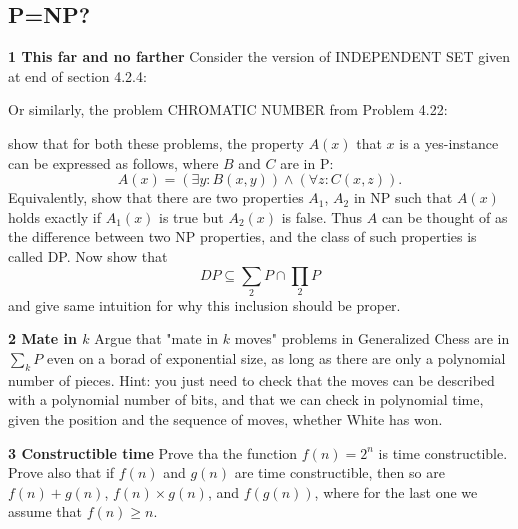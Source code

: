 \documentclass[a4paper,UTF8]{article}
\begin{document}
\subsection{P=NP?}
\textbf{1 This far and no farther} Consider the version of INDEPENDENT SET given at
end of section 4.2.4:
\begin{center}
\end{center}
Or similarly, the problem CHROMATIC NUMBER from Problem 4.22:
\begin{center}
\end{center}
show that for both these problems, the property $A(x)$ that $x$ is a yes-instance can be expressed
as follows, where $B$ and $C$ are in P:
$$ A(x) = (\exists y : B(x, y)) \wedge (\forall z : C(x, z)).$$
Equivalently, show that there are two properties $A_{1}$, $A_{2}$ in NP such that $A(x)$
holds exactly if $A_{1}(x)$ is true but $A_{2}(x)$ is false. Thus $A$ can be thought
of as the difference between two NP properties, and the class of such properties
is called DP. Now show that $$ DP \subseteq \sum_{2} P \cap  \prod_{2} P $$
and give same intuition for why this inclusion should be proper.

\vspace{6pt}

\textbf{2 Mate in $k$} Argue that "mate in $k$ moves" problems in Generalized Chess
are in $\sum_{k} P$ even on a borad of exponential size, as long as there are only
a polynomial number of pieces. Hint: you just need to check that the moves can be
described with a polynomial number of bits, and that we can check in polynomial
time, given the position and the sequence of moves, whether White has won.

\vspace{6pt}

\textbf{3 Constructible time} Prove tha the function $f(n) = 2^{n}$ is time constructible.
Prove also that if $f(n)$ and $g(n)$ are time constructible, then so are $f(n) + g(n)$,
$f(n) \times g(n)$, and $f(g(n))$, where for the last one we assume that $f(n) \geq n$.
\end{document}
